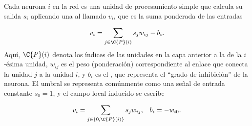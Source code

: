 Cada neurona $i$ en la red es una unidad de procesamiento simple que
calcula su salida $s_i$ aplicando una  al
llamado  $v_i$, que es la suma ponderada de
las entradas

\begin{align*}
  v_i = \sum_{j\in\C{P}(i)} s_j w_{ij} - b_i .
\end{align*}
Aquí, $\C{P}(i)$ denota los índices de las unidades en la capa
anterior a la de la $i$-ésima unidad, $w_{ij}$ es el peso
(ponderación) correspondiente al enlace que conecta la unidad $j$ a la
unidad $i$, y $b_i$ es el , que representa el ``grado de
inhibición'' de la neurona. El umbral se representa comúnmente
como una señal de entrada constante $s_0=1$, y el campo local inducido
se escribe

\begin{align*}
  v_i = \sum_{j\in\{0,\C{P}(i)\}} s_j w_{ij}, && b_i=-w_{i0}.
\end{align*}